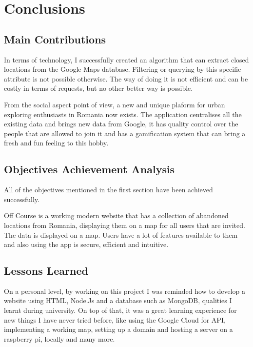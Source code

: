 \documentclass[12pt,a4paper]{report}
\begin{document}
\chapter*{Conclusions}

\section*{Main Contributions}

In terms of technology, I successfully created an algorithm that can extract closed locations from the Google Maps database. Filtering or querying by this specific attribute is not possible otherwise. The way of doing it is not efficient and can be costly in terms of requests, but no other better way is possible.

From the social aspect point of view, a new and unique plaform for urban exploring enthusiasts in Romania now exists. The application centralises all the existing data and brings new data from Google, it has quality control over the people that are allowed to join it and has a gamification system that can bring a fresh and fun feeling to this hobby.

\section*{Objectives Achievement Analysis}

All of the objectives mentioned in the first section have been achieved successfully. 

Off Course is a working modern website that has a collection of abandoned locations from Romania, displaying them on a map for all users that are invited. The data is displayed on a map. Users have a lot of features available to them and also using the app is secure, efficient and intuitive.

\section*{Lessons Learned}

On a personal level, by working on this project I was reminded how to develop a website using HTML, Node.Js and a database such as MongoDB, qualities I learnt during university. On top of that, it was a great learning experience for new things I have never tried before, like using the Google Cloud for API, implementing a working map, setting up a domain and hosting a server on a raspberry pi, locally and many more.
\end{document}
